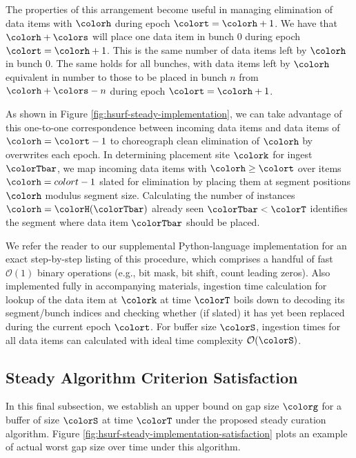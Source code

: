 

The properties of this arrangement become useful in managing elimination of data items with \hv{} $\colorh$ during epoch $\colort=\colorh + 1$.
We have that \hv{} $\colorh + \colors$ will place one data item in bunch 0 during epoch $\colort=\colorh + 1$.
This is the same number of data items left by \hv{} $\colorh$ in bunch 0.
The same holds for all bunches, with data items left by \hv{} $\colorh$ equivalent in number to those to be placed in bunch $n$ from \hv{} $\colorh + \colors - n$ during epoch $\colort = \colorh + 1$.

As shown in Figure \ref{fig:hsurf-steady-implementation}, we can take advantage of this one-to-one correspondence between incoming data items and data items of \hv{} $\colorh=\colort-1$ to choreograph clean elimination of \hv{} $\colorh$ by overwrites each epoch.
In determining placement site $\colork$ for ingest $\colorTbar$, we map incoming data items with \hv{} $\colorh \geq \colort$ over items $\colorh = colort - 1$ slated for elimination by placing them at segment positions $\colorh$ modulus segment size.
Calculating the number of \hv{} instances $\colorh = \colorH(\colorTbar)$ already seen $\colorTbar < \colorT$ identifies the segment where data item $\colorTbar$ should be placed.



We refer the reader to our supplemental Python-language implementation for an exact step-by-step listing of this procedure, which comprises a handful of fast $\mathcal{O}(1)$ binary operations (e.g., bit mask, bit shift, count leading zeros).
Also implemented fully in accompanying materials, ingestion time calculation for lookup of the data item at $\colork$ at time $\colorT$ boils down to decoding its segment/bunch indices and checking whether (if slated) it has yet been replaced during the current epoch $\colort$.
For buffer size $\colorS$, ingestion times for all data items can calculated with ideal time complexity $\mathcal{O}(\colorS)$.

\subsection{Steady Algorithm Criterion Satisfaction}
\label{sec:stready-satisfaction}

In this final subsection, we establish an upper bound on gap size $\colorg$ for a buffer of size $\colorS$ at time $\colorT$ under the proposed steady curation algorithm.
Figure \ref{fig:hsurf-steady-implementation-satisfaction} plots an example of actual worst gap size over time under this algorithm.


